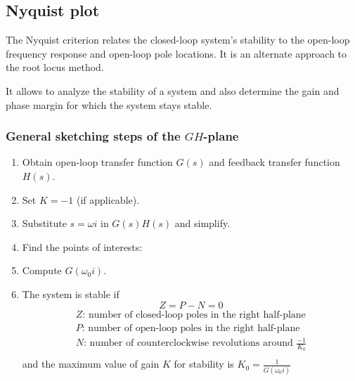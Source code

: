 \documentclass[10pt, twocolumn]{article}
\begin{document}
\subsection{Nyquist plot}
The Nyquist criterion relates the closed-loop system's stability to the open-loop frequency response and open-loop pole locations.
It is an alternate approach to the root locus method.

It allows to analyze the stability of a system and also determine the gain and phase margin for which the system stays stable.

\subsubsection{General sketching steps of the \(GH\)-plane}
\begin{enumerate}
  \item Obtain open-loop transfer function \(G(s)\) and feedback transfer function \(H(s)\).
  \item Set \(K = -1\) (if applicable).
  \item Substitute \(s = \omega i\) in \(G(s)H(s)\) and simplify.
  \item Find the points of interests:
  \item Compute \(G(\omega_0 i)\).
  \item The system is stable if
        \[
          Z = P - N = 0
        \]
        \[
          \begin{array}{|l}
            Z \text{: number of closed-loop poles in the right half-plane}           \\
            P \text{: number of open-loop poles in the right half-plane}             \\
            N \text{: number of counterclockwise revolutions around } \frac{-1}{K_0} \\
          \end{array}
        \]
        and the maximum value of gain \(K\) for stability is \(K_0 = \frac{1}{G(\omega_0 i)}\)
\end{enumerate}
\end{document}
